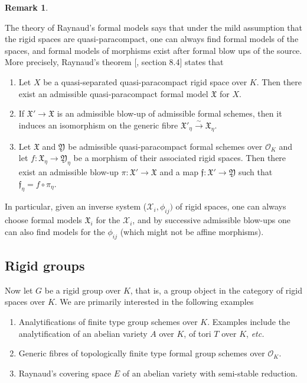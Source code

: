 \documentclass[10pt,oneside]{amsart}
\theoremstyle{definition}
\newtheorem{remark}[theorem]{Remark}
\begin{document}
 	\begin{remark} \label{Raynaud theory main theorem}
			
	The theory of Raynaud's formal models  says that under the mild assumption that the rigid spaces are quasi-paracompact,
	one can always find formal models of the spaces, and formal models of morphisms exist after formal blow ups of the source. More precisely, Raynaud's theorem [\cite{Bosch lectures}, section 8.4] states that
		
		\begin{enumerate}
			\item Let $X$ be a quasi-separated quasi-paracompact rigid space over $K$. Then there exist an admissible quasi-paracompact formal model $\mathfrak X$ for $X$.
			\item If $\mathfrak X'\rightarrow \mathfrak X$ is an admissible blow-up of admissible formal schemes, then it induces an isomorphism on the generic fibre  $\mathfrak X'_\eta \xrightarrow{\sim} \mathfrak X_\eta$.
			\item Let $\mathfrak X$ and $\mathfrak Y$ be admissible quasi-paracompact formal schemes over $\mathcal O_K$ and let $f:\mathfrak X_\eta \rightarrow \mathfrak Y_\eta$ be a morphism of their associated rigid spaces. Then there exist an admissible blow-up $\pi:\mathfrak X'\rightarrow \mathfrak X$ and a map $\mathfrak f:\mathfrak X'\rightarrow \mathfrak Y$ such that $\mathfrak f_\eta = f\circ \pi_\eta$.
		\end{enumerate}
		In particular, given an inverse system ($\mathcal X_i,\phi_{ij})$ of rigid spaces, one can always choose formal models $\mathfrak X_i$ for the $\mathcal X_i$, and by successive admissible blow-ups one can also find models for the $\phi_{ij}$ (which might not be affine morphisms). 
		\end{remark}

	
\subsection{Rigid groups}

Now let $G$ be a rigid group over $K$, that is, a group object in the category of rigid spaces over $K$.
	We are primarily interested in the following examples 
\begin{enumerate}	 
\item Analytifications of finite type group schemes over $K$. Examples include the analytification of an abelian variety $A$ over $K$, of tori $T$ over $K$, \textit{\small etc.}
\item Generic fibres of topologically finite type formal group schemes over $\mathcal O_K$. 
\item Raynaud's covering space $E$  of an abelian variety with semi-stable reduction.
\end{enumerate}
\end{document}

